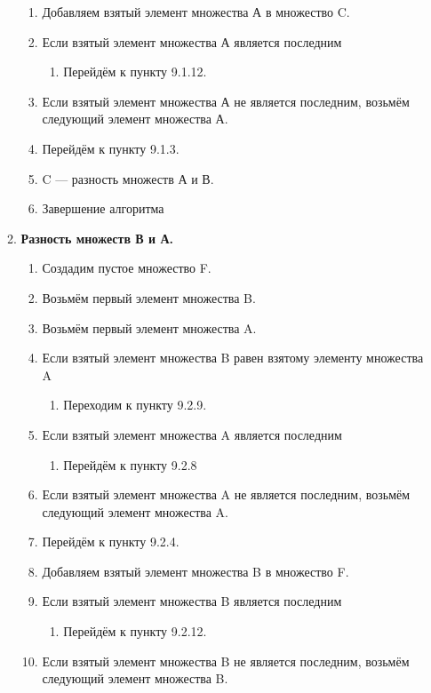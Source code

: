\documentclass[a4paper,12pt]{extarticle}
\begin{document}
\begin{enumerate}
\begin{enumerate}[label*=\arabic*.]
\begin{enumerate}[label*=\arabic*.]
      \item Добавляем взятый элемент множества А в множество C.
      \item Если взятый элемент множества А является последним
      \begin{enumerate}[label*=\arabic*.]
        \item Перейдём к пункту 9.1.12.
      \end{enumerate}
      \item Если взятый элемент множества А не является последним, возьмём следующий элемент множества А.
      \item Перейдём к пункту 9.1.3.
      \item C — разность множеств А и В.
      \item Завершение алгоритма
    \end{enumerate}
    \item \textbf{Разность множеств В и А.}
    \begin{enumerate}[label*=\arabic*.]
      \item Создадим пустое множество F.
      \item Возьмём первый элемент множества B.
      \item Возьмём первый элемент множества A.
      \item Если взятый элемент множества B равен взятому элементу множества A
      \begin{enumerate}[label*=\arabic*.]
        \item Переходим к пункту 9.2.9.
      \end{enumerate}
      \item Если взятый элемент множества A является последним
      \begin{enumerate}
        \item Перейдём к пункту 9.2.8
      \end{enumerate}
      \item Если взятый элемент множества A не является последним, возьмём следующий элемент множества A.
      \item Перейдём к пункту 9.2.4.
      \item Добавляем взятый элемент множества B в множество F.
      \item Если взятый элемент множества B является последним
      \begin{enumerate}[label*=\arabic*.]
        \item Перейдём к пункту 9.2.12.
      \end{enumerate}
      \item Если взятый элемент множества B не является последним, возьмём следующий элемент множества B.

\end{enumerate}
\end{enumerate}
\end{enumerate}
\end{document}
